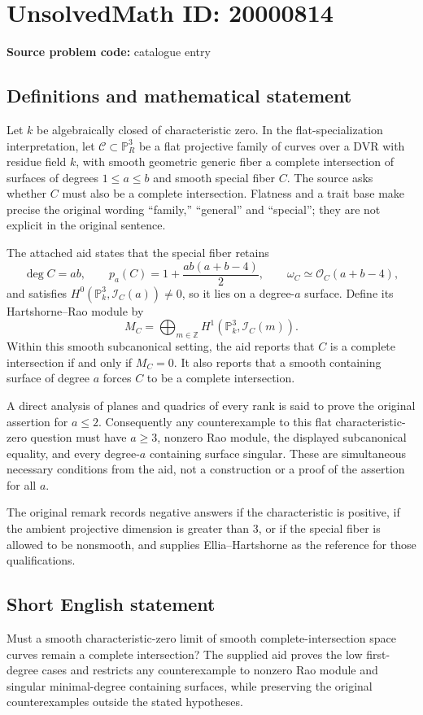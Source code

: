 \documentclass[11pt]{article}
\newcommand{\Z}{\mathbb{Z}}
\newcommand{\PP}{\mathbb{P}}
\begin{document}
\section*{UnsolvedMath ID: 20000814}
\textbf{Source problem code:} catalogue entry
\subsection{Definitions and mathematical statement}
Let $k$ be algebraically closed of characteristic zero. In the flat-specialization interpretation, let $\mathcal C\subset\PP_R^3$ be a flat projective family of curves over a DVR with residue field $k$, with smooth geometric generic fiber a complete intersection of surfaces of degrees $1\le a\le b$ and smooth special fiber $C$. The source asks whether $C$ must also be a complete intersection. Flatness and a trait base make precise the original wording ``family,'' ``general'' and ``special''; they are not explicit in the original sentence.

The attached aid states that the special fiber retains
\[
\deg C=ab,\qquad p_a(C)=1+\frac{ab(a+b-4)}2,\qquad
\omega_C\simeq\mathcal O_C(a+b-4),
\]
and satisfies $H^0(\PP_k^3,\mathcal I_C(a))\ne0$, so it lies on a degree-$a$ surface. Define its Hartshorne--Rao module by
\[
M_C=\bigoplus_{m\in\Z}H^1(\PP_k^3,\mathcal I_C(m)).
\]
Within this smooth subcanonical setting, the aid reports that $C$ is a complete intersection if and only if $M_C=0$. It also reports that a smooth containing surface of degree $a$ forces $C$ to be a complete intersection.

A direct analysis of planes and quadrics of every rank is said to prove the original assertion for $a\le2$. Consequently any counterexample to this flat characteristic-zero question must have $a\ge3$, nonzero Rao module, the displayed subcanonical equality, and every degree-$a$ containing surface singular. These are simultaneous necessary conditions from the aid, not a construction or a proof of the assertion for all $a$.

The original remark records negative answers if the characteristic is positive, if the ambient projective dimension is greater than $3$, or if the special fiber is allowed to be nonsmooth, and supplies Ellia--Hartshorne as the reference for those qualifications.
\subsection{Short English statement}
Must a smooth characteristic-zero limit of smooth complete-intersection space curves remain a complete intersection? The supplied aid proves the low first-degree cases and restricts any counterexample to nonzero Rao module and singular minimal-degree containing surfaces, while preserving the original counterexamples outside the stated hypotheses.
\end{document}
